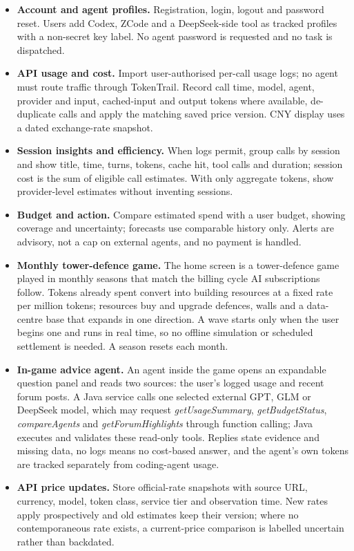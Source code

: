 \documentclass[10pt,a4paper]{article}
\newcommand{\sect}[1]{\vspace{3pt}{\large\bfseries#1}\par\vspace{1pt}}
\newcommand{\smallhead}[1]{{\bfseries#1}}
\begin{document}
\sect{5. Core features and implementation approach}
\begin{itemize}
  \item \smallhead{Account and agent profiles.} Registration, login, logout and password reset. Users add Codex, ZCode and a DeepSeek-side tool as tracked profiles with a non-secret key label. No agent password is requested and no task is dispatched.
  \item \smallhead{API usage and cost.} Import user-authorised per-call usage logs; no agent must route traffic through TokenTrail. Record call time, model, agent, provider and input, cached-input and output tokens where available, de-duplicate calls and apply the matching saved price version. CNY display uses a dated exchange-rate snapshot.
  \item \smallhead{Session insights and efficiency.} When logs permit, group calls by session and show title, time, turns, tokens, cache hit, tool calls and duration; session cost is the sum of eligible call estimates. With only aggregate tokens, show provider-level estimates without inventing sessions.
  \item \smallhead{Budget and action.} Compare estimated spend with a user budget, showing coverage and uncertainty; forecasts use comparable history only. Alerts are advisory, not a cap on external agents, and no payment is handled.
  \item \smallhead{Monthly tower-defence game.} The home screen is a tower-defence game played in monthly seasons that match the billing cycle AI subscriptions follow. Tokens already spent convert into building resources at a fixed rate per million tokens; resources buy and upgrade defences, walls and a data-centre base that expands in one direction. A wave starts only when the user begins one and runs in real time, so no offline simulation or scheduled settlement is needed. A season resets each month.
  \item \smallhead{In-game advice agent.} An agent inside the game opens an expandable question panel and reads two sources: the user's logged usage and recent forum posts. A Java service calls one selected external GPT, GLM or DeepSeek model, which may request \emph{getUsageSummary}, \emph{getBudgetStatus}, \emph{compareAgents} and \emph{getForumHighlights} through function calling; Java executes and validates these read-only tools. Replies state evidence and missing data, no logs means no cost-based answer, and the agent's own tokens are tracked separately from coding-agent usage.
  \item \smallhead{API price updates.} Store official-rate snapshots with source URL, currency, model, token class, service tier and observation time. New rates apply prospectively and old estimates keep their version; where no contemporaneous rate exists, a current-price comparison is labelled uncertain rather than backdated.
\end{itemize}
\end{document}
